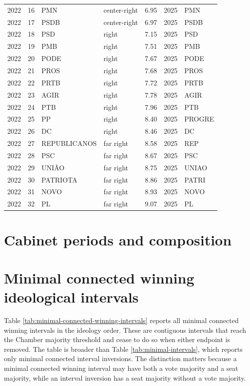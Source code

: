 \documentclass[11pt]{article}
\newcommand{\RepoRoot}{/home/marcelo/Sync/Projects/electoral-inversion}%
\newcommand{\RepoRoot}{/home/marcelovmaciel/Sync/Projects/electoral_inversions}%
\newcommand{\ArtifactRoot}{\RepoRoot/processing/Processing/output/paper}
\begin{document}
\begin{longtable}{rrlllrl}
2022 & 16 & PMN & center-right & 6.95 & 2025 & PMN \\
2022 & 17 & PSDB & center-right & 6.97 & 2025 & PSDB \\
2022 & 18 & PSD & right & 7.15 & 2025 & PSD \\
2022 & 19 & PMB & right & 7.51 & 2025 & PMB \\
2022 & 20 & PODE & right & 7.67 & 2025 & PODE \\
2022 & 21 & PROS & right & 7.68 & 2025 & PROS \\
2022 & 22 & PRTB & right & 7.72 & 2025 & PRTB \\
2022 & 23 & AGIR & right & 7.78 & 2025 & AGIR \\
2022 & 24 & PTB & right & 7.96 & 2025 & PTB \\
2022 & 25 & PP & right & 8.40 & 2025 & PROGRE \\
2022 & 26 & DC & right & 8.46 & 2025 & DC \\
2022 & 27 & REPUBLICANOS & far right & 8.58 & 2025 & REP \\
2022 & 28 & PSC & far right & 8.67 & 2025 & PSC \\
2022 & 29 & UNIÃO & far right & 8.75 & 2025 & UNIAO \\
2022 & 30 & PATRIOTA & far right & 8.86 & 2025 & PATRI \\
2022 & 31 & NOVO & far right & 8.93 & 2025 & NOVO \\
2022 & 32 & PL & far right & 9.07 & 2025 & PL \\
\bottomrule
\end{longtable}

\section{Cabinet periods and composition}
\label{app:composition}




\section{Minimal connected winning ideological intervals}
\label{app:minimal-connected-winning}

Table \ref{tab:minimal-connected-winning-intervals} reports all
minimal connected winning intervals in the ideology order. These are
contiguous intervals that reach the Chamber majority threshold and cease to do
so when either endpoint is removed. The table is broader than Table
\ref{tab:minimal-intervals}, which reports only minimal connected interval
inversions. The distinction matters because a minimal connected winning interval
may have both a vote majority and a seat majority, while an interval inversion
has a seat majority without a vote majority.
\end{document}

